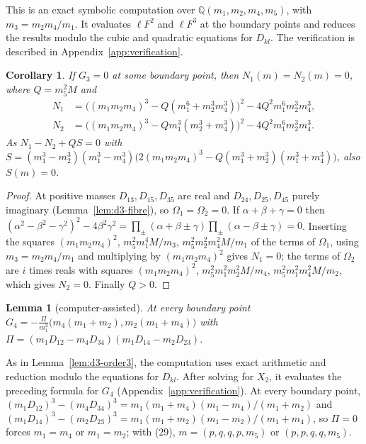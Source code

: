 \documentclass[Threeside,11pt]{article}
\newtheorem{lemma}[theorem]{Lemma}
\newtheorem{corollary}[theorem]{Corollary}
\theoremstyle{definition}
\theoremstyle{remark}
\numberwithin{equation}{section}
\theoremstyle{remark}
\begin{document}
{This is an exact symbolic computation over $\mathbb Q(m_1,m_2,m_4,m_5)$,
with $m_3=m_2m_4/m_1$. It evaluates $\ell F^2$ and $\ell F^3$ at the boundary points and reduces the
results modulo the cubic and quadratic equations for $D_{kl}$.
The verification is described in Appendix~\ref{app:verification}.}

\begin{corollary}\label{cor:d3-order3}
If $G_3=0$ at some boundary point, then $N_1(m)=N_2(m)=0$, where $Q=m_5^2M$ and
\begin{align*}
N_1&=\bigl((m_1m_2m_4)^3-Q(m_1^6+m_2^3m_4^3)\bigr)^2-4Q^2m_1^6m_2^3m_4^3,\\
N_2&=\bigl((m_1m_2m_4)^3-Qm_1^3(m_2^3+m_4^3)\bigr)^2-4Q^2m_1^6m_2^3m_4^3 .
\end{align*}
As $N_1-N_2+QS=0$ with
$S=(m_1^3-m_2^3)(m_1^3-m_4^3)\bigl(2(m_1m_2m_4)^3-Q(m_1^3+m_2^3)(m_1^3+m_4^3)\bigr)$, also
$S(m)=0$.
\end{corollary}

\begin{proof}
At positive masses $D_{13},D_{15},D_{35}$ are real and $D_{24},D_{25},D_{45}$ purely imaginary
(Lemma~\ref{lem:d3-fibre}), so $\Omega_1=\Omega_2=0$.  If
$\alpha+\beta+\gamma=0$ then $(\alpha^2-\beta^2-\gamma^2)^2-4\beta^2\gamma^2=\prod_\pm(\alpha+\beta
\pm\gamma)\prod_\pm(\alpha-\beta\pm\gamma)=0$.  Inserting the squares $(m_1m_2m_4)^2$,
$m_5^2m_1^4M/m_3$, $m_5^2m_2^2m_4^2M/m_1$ of the terms of $\Omega_1$, using
$m_3=m_2m_4/m_1$ and multiplying by $(m_1m_2m_4)^2$ gives $N_1=0$; the terms of
$\Omega_2$ are $i$ times reals with squares $(m_1m_2m_4)^2$, $m_5^2m_1^2m_2^2M/m_4$,
$m_5^2m_1^2m_4^2M/m_2$, which gives $N_2=0$.  Finally $Q>0$.
\end{proof}

\begin{lemma}[computer-assisted]\label{lem:d3-order4}
At every boundary point $G_4=-\frac{\Pi}{m_1^2}\bigl(m_4(m_1+m_2),m_2(m_1+m_4)\bigr)$ with
$\Pi=(m_1D_{12}-m_4D_{34})(m_1D_{14}-m_2D_{23})$.
\end{lemma}

{As in Lemma~\ref{lem:d3-order3}, the computation uses exact arithmetic and reduction
modulo the equations for $D_{kl}$. After solving for $X_2$, it evaluates the preceding formula
for $G_4$ (Appendix~\ref{app:verification}). At every boundary point,}
$(m_1D_{12})^3-(m_4D_{34})^3=m_1(m_1+m_4)(m_1-m_4)/(m_1+m_2)$ and
$(m_1D_{14})^3-(m_2D_{23})^3=m_1(m_1+m_2)(m_1-m_2)/(m_1+m_4)$, so $\Pi=0$ forces $m_1=m_4$ or
$m_1=m_2$; with (29), $m=(p,q,q,p,m_5)$ or $(p,p,q,q,m_5)$.
\end{document}
